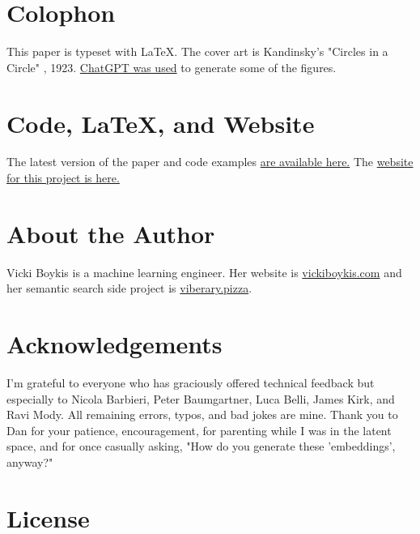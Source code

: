 \documentclass[11pt, table]{diazessay} %
\begin{document}
\begin{sloppypar}
\begin{abstract}
\end{abstract}

\section*{Colophon }
This paper is typeset with \LaTeX. The cover art is Kandinsky's "Circles in a Circle" , 1923. \href{https://vickiboykis.com/2023/02/26/what-should-you-use-chatgpt-for/}{ChatGPT was used} to generate some of the figures.

\section*{Code, \LaTeX, and Website}
The latest version of the paper and code examples \href{https://github.com/veekaybee/what_are_embeddings}{are available here.} The   \href{http://vickiboykis.com/what_are_embeddings/}{website for this project is here.}

\section*{About the Author}
Vicki Boykis is a machine learning engineer. Her website is \href{https://www.vickiboykis.com}{vickiboykis.com} and her semantic search side project is \href{https://viberary.pizza}{viberary.pizza}. 


\section*{Acknowledgements}
I'm grateful to everyone who has graciously offered technical feedback but especially to Nicola Barbieri, Peter Baumgartner, Luca Belli, James Kirk, and Ravi Mody. All remaining errors, typos, and bad jokes are mine. Thank you to Dan for your patience, encouragement, for parenting while I was in the latent space, and for once casually asking, "How do you generate these 'embeddings', anyway?"

\section*{License}
\doclicenseThis
\newpage

\tableofcontents
\newpage


\end{sloppypar}
\end{document}
